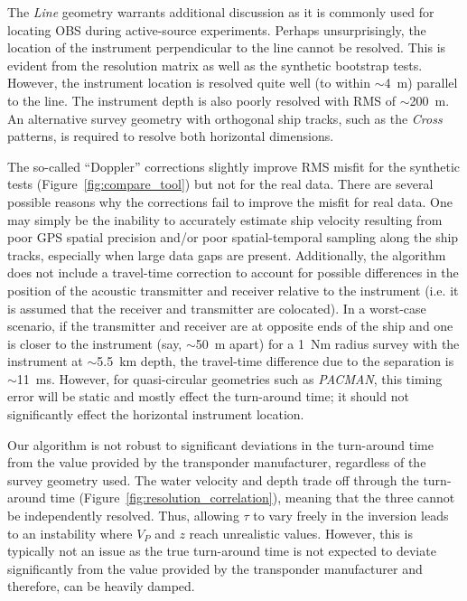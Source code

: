 The \textit{Line} geometry warrants additional discussion as it is commonly used for locating OBS during active-source experiments. Perhaps unsurprisingly, the location of the instrument perpendicular to the line cannot be resolved. This is evident from the resolution matrix as well as the synthetic bootstrap tests. However, the instrument location is resolved quite well (to within $\sim$4~m) parallel to the line. The instrument depth is also poorly resolved with RMS of $\sim$200~m. An alternative survey geometry with orthogonal ship tracks, such as the \textit{Cross} patterns, is required to resolve both horizontal dimensions.

The so-called ``Doppler'' corrections slightly improve RMS misfit for the synthetic tests (Figure~\ref{fig:compare_tool}) but not for the real data. There are several possible reasons why the corrections fail to improve the misfit for real data. One may simply be the inability to accurately estimate ship velocity resulting from poor GPS spatial precision and/or poor spatial-temporal sampling along the ship tracks, especially when large data gaps are present. Additionally, the algorithm does not include a travel-time correction to account for possible differences in the position of the acoustic transmitter and receiver relative to the instrument (i.e. it is assumed that the receiver and transmitter are colocated). In a worst-case scenario, if the transmitter and receiver are at opposite ends of the ship and one is closer to the instrument (say, $\sim$50~m apart) for a 1~Nm radius survey with the instrument at $\sim$5.5~km depth, the travel-time difference due to the separation is $\sim$11~ms. However, for quasi-circular geometries such as \textit{PACMAN}, this timing error will be static and mostly effect the turn-around time; it should not significantly effect the horizontal instrument location.

Our algorithm is not robust to significant deviations in the turn-around time from the value provided by the transponder manufacturer, regardless of the survey geometry used. The water velocity and depth trade off through the turn-around time (Figure~\ref{fig:resolution_correlation}), meaning that the three cannot be independently resolved. Thus, allowing $\tau$ to vary freely in the inversion leads to an instability where $V_P$ and $z$ reach unrealistic values. However, this is typically not an issue as the true turn-around time is not expected to deviate significantly from the value provided by the transponder manufacturer and therefore, can be heavily damped.